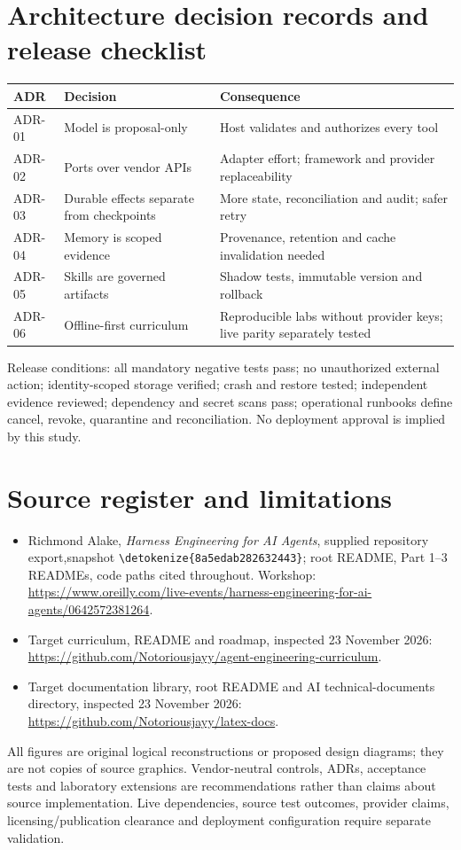 \documentclass[11pt,letterpaper]{article}
\newcommand{\src}[1]{\expandafter\nolinkurl\expandafter{\detokenize{#1}}}
\begin{document}
\section{Architecture decision records and release checklist}
\begin{tabularx}{\linewidth}{p{.19\linewidth}YY}\toprule
ADR & Decision & Consequence \\\midrule
ADR-01 & Model is proposal-only & Host validates and authorizes every tool \\
ADR-02 & Ports over vendor APIs & Adapter effort; framework and provider replaceability \\
ADR-03 & Durable effects separate from checkpoints & More state, reconciliation and audit; safer retry \\
ADR-04 & Memory is scoped evidence & Provenance, retention and cache invalidation needed \\
ADR-05 & Skills are governed artifacts & Shadow tests, immutable version and rollback \\
ADR-06 & Offline-first curriculum & Reproducible labs without provider keys; live parity separately tested \\
\bottomrule\end{tabularx}

Release conditions: all mandatory negative tests pass; no unauthorized external action; identity-scoped storage verified; crash and restore tested; independent evidence reviewed; dependency and secret scans pass; operational runbooks define cancel, revoke, quarantine and reconciliation. No deployment approval is implied by this study.
\section{Source register and limitations}
\begin{itemize}
\item Richmond Alake, \textit{Harness Engineering for AI Agents}, supplied repository export,\newline snapshot \src{8a5edab282632443}; root README, Part 1--3 READMEs, code paths cited throughout. Workshop: \url{https://www.oreilly.com/live-events/harness-engineering-for-ai-agents/0642572381264}.
\item Target curriculum, README and roadmap, inspected 23 November 2026: \url{https://github.com/Notoriousjayy/agent-engineering-curriculum}.
\item Target documentation library, root README and AI technical-documents directory, inspected 23 November 2026: \url{https://github.com/Notoriousjayy/latex-docs}.
\end{itemize}
All figures are original logical reconstructions or proposed design diagrams; they are not copies of source graphics. Vendor-neutral controls, ADRs, acceptance tests and laboratory extensions are recommendations rather than claims about source implementation. Live dependencies, source test outcomes, provider claims, licensing/publication clearance and deployment configuration require separate validation.
\end{document}
